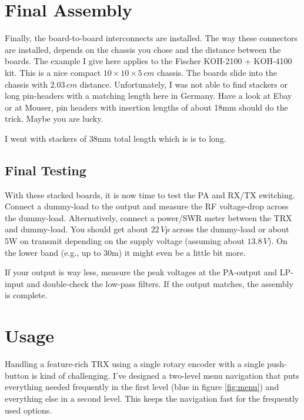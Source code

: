\documentclass[10pt, a4paper]{scrartcl}
\begin{document}
\clearpage
\section{Final Assembly} \label{sec:box}
Finally, the board-to-board interconnects are installed. The way these connectors are installed, depends on the chassis you chose and the distance between the boards. The example I give here applies to the Fischer KOH-2100 + KOH-4100 kit. This is a nice compact $10 \times 10 \times 5\,cm$ chassis. The boards slide into the chassis with $2.03\,cm$ distance. Unfortunately, I was not able to find stackers or long pin-headers with a matching length here in Germany. Have a look at Ebay or at Mouser, pin headers with insertion lengths of about 18mm should do the trick. Maybe you are lucky.

I went with stackers of 38mm total length which is is to long.

\subsection{Final Testing}
With these stacked boards, it is now time to test the PA and RX/TX switching. Connect a dummy-load to the output and measure the RF voltage-drop across the dummy-load. Alternatively, connect a power/SWR meter between the TRX and dummy-load. You should get about $22\,Vp$ across the dummy-load or about 5W on transmit depending on the supply voltage (assuming about $13.8\,V$). On the lower band (e.g., up to 30m) it might even be a little bit more. 

If your output is way less, measure the peak voltages at the PA-output and LP-input and double-check the low-pass filters. If the output matches, the assembly is complete. 

\clearpage
\section{Usage} \label{sec:user}
Handling a feature-rich TRX using a single rotary encoder with a single push-button is kind of challenging. I've designed a two-level menu navigation that puts everything needed frequently in the first level (blue in figure \ref{fig:menu}) and everything else in a second level. This keeps the navigation fast for the frequently used options. 
\end{document}
